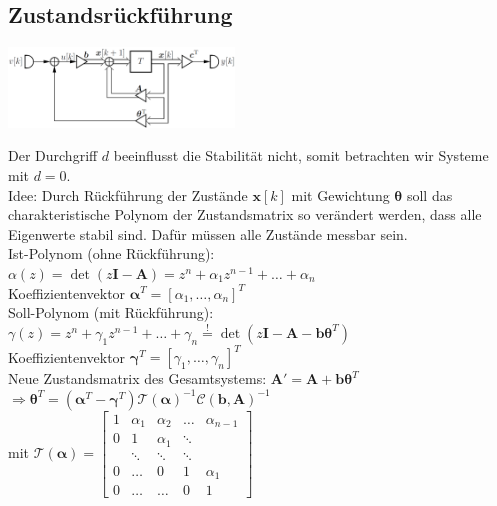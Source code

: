 \documentclass[a4paper,landscape,6pt]{article}
\newcommand{\ma}[1]{\ensuremath{\boldsymbol {#1}}}								%
\newcommand{\mat}[1]{\ensuremath{\begin{bmatrix} #1 \end{bmatrix}}}				%
\renewcommand{\vec}[1]{\ensuremath{\boldsymbol {#1}}}							%
\begin{document}
\begin{multicols}{3}
\subsection*{Zustandsrückführung}
	\begin{minipage}[t]{0.5\textwidth}
	\hspace{1 cm}
	\includegraphics[width=0.45\textwidth]{images_ssp/Statefeedback}\\
\end{minipage}
Der Durchgriff $d$ beeinflusst die Stabilität nicht, somit betrachten wir Systeme mit $d=0$.\\
Idee: Durch Rückführung der Zustände $\vec x[k]$ mit Gewichtung $\vec \theta$ soll das charakteristische Polynom der Zustandsmatrix so verändert werden, dass alle Eigenwerte stabil sind. Dafür müssen alle Zustände messbar sein.\\

Ist-Polynom (ohne Rückführung):\\
$\alpha(z) = \det(z\ma I - \ma A) = z^n + \alpha_1 z^{n-1} + \dots + \alpha_n$\\
Koeffizientenvektor $\vec \alpha ^T = [\alpha_1,\dots,\alpha_n]^T$\\

Soll-Polynom (mit Rückführung):\\
$\gamma(z) = z^n + \gamma_1 z^{n-1} + \dots + \gamma_n \overset{!}{=}  \det(z\ma I - \ma A - \vec b \vec \theta ^T)$\\
Koeffizientenvektor $\vec \gamma ^T = [\gamma_1,\dots,\gamma_n]^T$\\
Neue Zustandsmatrix des Gesamtsystems: $\ma A' = \ma A + \vec b \vec \theta ^T$\\

$\Rightarrow \boxed{\vec \theta ^T = (\vec \alpha ^T - \vec \gamma ^T) \ma{\mathcal{T}}(\vec \alpha)^{-1} \ma{\mathcal{C}}(\vec b, \ma A)^{-1}}$\\

mit $\ma{\mathcal{T}}(\vec \alpha) = \mat{1 & \alpha_1 & \alpha_2 & \dots & \alpha_{n-1} \\ 0 & 1 & \alpha_1 & \ddots & \\ & \ddots & \ddots & \ddots & \\ 0 & \dots & 0 & 1 & \alpha_1 \\ 0 & \dots & \dots  & 0 & 1}$\\


\end{multicols}
\end{document}
